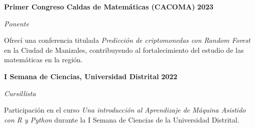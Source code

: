 \documentclass[paper=a4,fontsize=11pt]{scrartcl} %
\newcommand{\sepspace}{\vspace*{0.8em}}
\newcommand{\EducationEntry}[4]{%
  \noindent \textbf{#1} \hfill \textbf{#2} \par
  \noindent \textit{#3} \par
  \noindent \small #4 
  \normalsize \par \sepspace
}
\begin{document}
\EducationEntry{Primer Congreso Caldas de Matemáticas (CACOMA)}{2023}{Ponente}{%
Ofrecí una conferencia titulada \textit{Predicción de criptomonedas con Random Forest} en la Ciudad de Manizales, contribuyendo al fortalecimiento del estudio de las matemáticas en la región.
}

\EducationEntry{I Semana de Ciencias, Universidad Distrital}{2022}{Cursillista}{%
Participación en el curso \textit{Una introducción al Aprendizaje de Máquina Asistido con R y Python} durante la I Semana de Ciencias de la Universidad Distrital.
}

\sepspace
\end{document}
